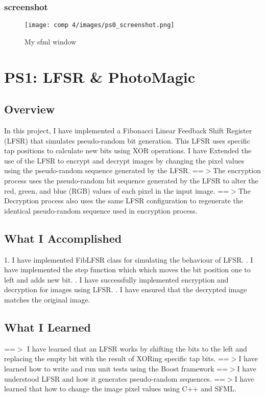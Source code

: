 \documentclass[12pt]{article}
\begin{document}
\subsubsection{screenshot}
\begin{figure}[tbh]
	\centering
	\texttt{[image: comp 4/images/ps0\_screenshot.png]}
	\caption{My sfml window}
	
\end{figure}

\newpage

\section{PS1: LFSR \& PhotoMagic}
\subsection{Overview}
In this project, I have implemented a Fibonacci Linear Feedback Shift Register (LFSR) that simulates pseudo-random bit generation. This LFSR uses specific tap positions to calculate new bits using XOR operations.  
\newline
I have Extended the use of the LFSR to encrypt and decrypt images by changing the pixel values using the pseudo-random sequence generated by the LFSR.
\newline
==$>$The encryption process uses the pseudo-random bit sequence generated by the LFSR to alter the red, green, and blue (RGB) values of each pixel in the input image.
\newline
==$>$The Decryption process also uses the same LFSR configuration to regenerate the identical pseudo-random sequence used in encryption process.

\subsection{What I Accomplished}
 1. I have implemented FibLFSR class for simulating the behaviour of LFSR.
. I have implemented the step function which which moves the bit position one to left and adds new bit.
. I have successfully implemented encryption and decryption for images using LFSR.
. I have ensured that the decrypted image matches the original image.
\subsection{What I Learned}
==$>$ I have learned that an LFSR works by shifting the bits to the left and replacing the empty bit with the result of XORing specific tap bits.
\newline
==$>$I have learned how to write and run unit tests using the Boost framework
\newline
==$>$I have understood LFSR and how it generates pseudo-random sequences.
\newline
==$>$I have learned that how to change the image pixel values using C++ and SFML.
\end{document}
